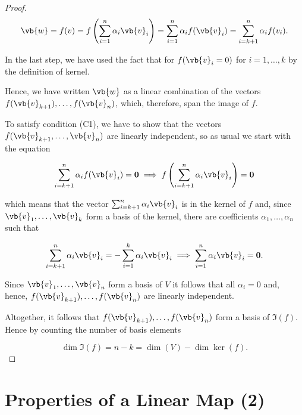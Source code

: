 \documentclass[a4paper,12pt]{report}
\begin{document}
\begin{appendices}
\begin{proof}
\begin{equation}
    \vb{w} = f(v) = f \left( \sum_{i=1}^{n} \alpha _{i} \vb{v} _{i}  \right) = \sum_{i=1}^{n} \alpha _{i} f(\vb{v} _{i} ) = \sum_{i=k+1}^{n} \alpha _{i} f(v_{i} ).  
\end{equation}
    
In the last step, we have used the fact that for \(f(\vb{v} _{i} = 0 )\) for \(i = 1,\ldots , k\) by the definition of kernel.
    
Hence, we have written \(\vb{w}\) as a linear combination of the vectors \(f(\vb{v} _{k+1} ), \ldots , f(\vb{v} _{n} )\), which, therefore, span the image of \(f\).
    
To satisfy condition (C1), we have to show that the vectors \(f(\vb{v} _{k+1}, \ldots , \vb{v} _{n}  )\) are linearly independent, so as usual we start with the equation
    
\begin{equation}
        \sum_{i=k+1}^{n} \alpha _{i}f(\vb{v} _{i} ) = \boldsymbol{0}  \implies f \left( \sum_{i=k+1}^{n} \alpha _{i}\vb{v} _{i}   \right) = \boldsymbol{0}   
\end{equation}
    
which means that the vector \(\sum_{i=k+1}^{n} \alpha _{i} \vb{v} _{i} \) is in the kernel of \(f\) and, since \(\vb{v}_{1}, \ldots, \vb{v}_k \) form a basis of the kernel, there are coefficients \(\alpha _{1} ,\ldots ,\alpha _{n} \) such that
    
\begin{equation}
        \sum_{i=k+1}^{n} \alpha _{i} \vb{v} _{i} = -\sum_{i=1}^{k} \alpha _{i} \vb{v} _{i} \implies \sum_{i=1}^{n} \alpha _{i} \vb{v} _{i} = \boldsymbol{0} .
\end{equation}
    
Since \(\vb{v}_{1}, \ldots, \vb{v}_n \) form a basis of \(V\) it follows that all \(\alpha _{i} = 0\) and, hence, \(f(\vb{v} _{k+1} ),\ldots , f(\vb{v} _{n} )\) are linearly independent. 
    
Altogether, it follows that \(f(\vb{v} _{k+1} ), \ldots , f(\vb{v} _{n} )\) form a basis of \(\Im (f)\). Hence by counting the number of basis elements
    
\begin{equation}
    \dim \Im (f) = n-k = \dim (V) - \dim \ker (f).
\end{equation}
    
\end{proof}

\section{Properties of a Linear Map (2)} \label{linearmapprop2app}


\end{appendices}
\end{document}
